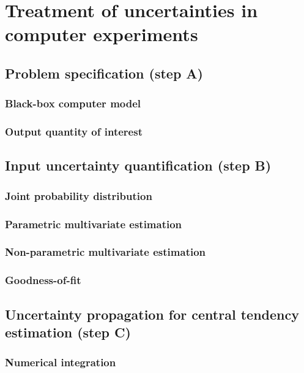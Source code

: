 \chapter{Treatment of uncertainties in computer experiments}
    \section{Problem specification (step A)}
        \subsection{Black-box computer model}
        \subsection{Output quantity of interest}
    \section{Input uncertainty quantification (step B)}
        \subsection{Joint probability distribution }
        \subsection{Parametric multivariate estimation}
        \subsection{Non-parametric multivariate estimation}
        \subsection{Goodness-of-fit}
    \section{Uncertainty propagation for central tendency estimation (step C)}
        \subsection{Numerical integration}
